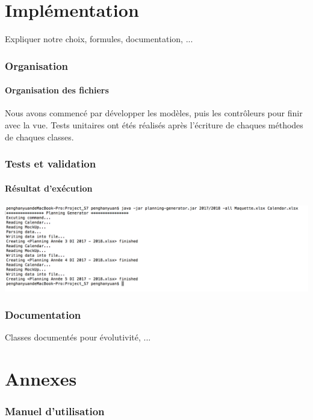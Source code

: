 \documentclass{polytech/polytech}
\begin{document}
	\part{Implémentation}

	Expliquer notre choix, formules, documentation, ...

	\section{Organisation}

	\subsection{Organisation des fichiers}

	Nous avons commencé par développer les modèles, puis les contrôleurs pour finir avec la vue.
	Tests unitaires ont étés réalisés après l'écriture de chaques méthodes de chaques classes.

	\section{Tests et validation}
	\subsection{Résultat d'exécution}
	\includegraphics[width=\textwidth]{./img/excution_result.png}
	\section{Documentation}

	Classes documentés pour évolutivité, ...

	\part{Annexes}

	\section{Manuel d'utilisation}
	
\end{document}
